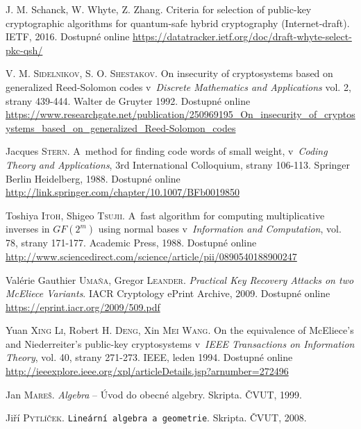 \documentclass[thesis=M,czech,hidelinks]{FITthesis}[2012/06/26]
\newcommand{\0}{{\textcolor[gray]{0.75}{0}}}
\begin{document}
\begin{thebibliography}{99}
        J. M. Schanck, W. Whyte, Z. Zhang. Criteria for selection of public-key
        cryptographic algorithms for quantum-safe hybrid cryptography
        (Internet-draft). IETF, 2016. Dostupné online
        \url{https://datatracker.ietf.org/doc/draft-whyte-select-pkc-qsh/}

        V. M. \textsc{Sidelnikov}, S. O. \textsc{Shestakov}. On insecurity of
        cryptosystems based on generalized Reed-Solomon codes v~\emph{Discrete
        Mathematics and Applications} vol. 2, strany 439-444. Walter de Gruyter
        1992. Dostupné online
        \url{https://www.researchgate.net/publication/250969195\_On\_insecurity\_of\_cryptosystems\_based\_on\_generalized\_Reed-Solomon\_codes}

        Jacques \textsc{Stern}. A~method for finding code words of small weight,
        v~\emph{Coding Theory and Applications}, 3rd International Colloquium,
        strany 106-113. Springer Berlin Heidelberg, 1988. Dostupné online
        \url{http://link.springer.com/chapter/10.1007/BFb0019850}

        Toshiya \textsc{Itoh}, Shigeo \textsc{Tsujii}. A~fast algorithm for
        computing multiplicative inverses in $GF(2^m)$ using normal bases
        v~\emph{Information and Computation}, vol. 78, strany 171-177. Academic
        Press, 1988.  Dostupné online
        \url{http://www.sciencedirect.com/science/article/pii/0890540188900247}

        Valérie Gauthier \textsc{Umaña}, Gregor \textsc{Leander}.
        \emph{Practical Key Recovery Attacks on two McEliece Variants}.
        IACR Cryptology ePrint Archive, 2009.  Dostupné online
        \url{https://eprint.iacr.org/2009/509.pdf}

        Yuan \textsc{Xing Li}, Robert H. \textsc{Deng}, Xin \textsc{Mei Wang}.
        On the equivalence of McEliece's and Niederreiter's public-key
        cryptosystems v~\emph{IEEE Transactions on Information Theory}, vol. 40,
        strany 271-273. IEEE, leden 1994. Dostupné online
        \url{http://ieeexplore.ieee.org/xpl/articleDetails.jsp?arnumber=272496}


        Jan \textsc{Mareš}. \emph{Algebra} -- Úvod do obecné algebry. Skripta.
        ČVUT, 1999.

        Jiří \textsc{Pytlíček}. \texttt{Lineární algebra a geometrie}. Skripta.
        ČVUT, 2008.


\end{thebibliography}
\end{document}

